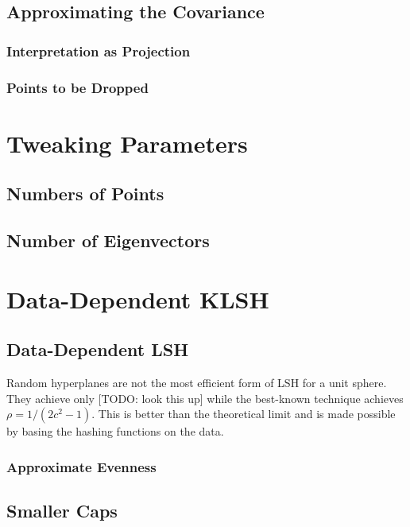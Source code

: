 \documentclass[twoside,11pt]{homework}
\begin{document}
\begin{multicols}{2}
\subsection{Approximating the Covariance} %

\subsubsection{Interpretation as Projection} %

\subsubsection{Points to be Dropped} %

\section{Tweaking Parameters} %

\subsection{Numbers of Points}

\subsection{Number of Eigenvectors}

\section{Data-Dependent KLSH} %

\subsection{Data-Dependent LSH}

Random hyperplanes are not the most efficient form of LSH for a unit
sphere.  They achieve only [TODO: look this up] while the best-known
technique achieves $\rho=1/(2c^2-1)$.  This is better than the
theoretical limit and is made possible by basing the hashing functions
on the data.

\subsubsection{Approximate Evenness}



\subsection{Smaller Caps}


\end{multicols}
\end{document}
